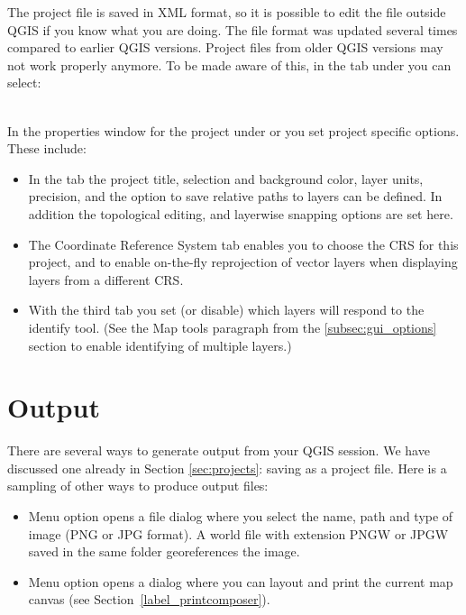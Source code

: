 The project file is saved in XML format, so it is possible to edit
the file outside QGIS if you know what you are doing. The file format
was updated several times compared to earlier QGIS versions. Project files
from older QGIS versions may not work properly anymore. To be made aware of this,
in the  tab under  \arrow {}
you can select: \\

 \\

In the properties window for the project under  or  you set project specific options. These
include:

\begin{itemize}
\item In the  tab the project title, selection and background
color, layer units, precision, and the option to save relative paths to
layers can be defined. In addition the topological editing, and layerwise
snapping options are set here.
\item The  Coordinate Reference System tab enables you to choose the
CRS for this project, and to enable on-the-fly reprojection of vector layers
when displaying layers from a different CRS.
\item With the third  tab you set (or disable) which
layers will respond to the identify tool. (See the Map tools paragraph from
the \ref{subsec:gui_options} section to enable identifying of multiple layers.)
\end{itemize}

\section{Output}\label{sec:output}

There are several ways to generate output from your QGIS session. We have
discussed one already in Section \ref{sec:projects}: saving as a project file.
Here is a sampling of other ways to produce output files:

\begin{itemize}
\item Menu option  opens
a file dialog where you select the name, path and type of image (PNG or JPG
format). A world file with extension PNGW or JPGW saved in the same folder
georeferences the image.
\item Menu option  opens a
dialog where you can layout and print the current map canvas (see
Section~\ref{label_printcomposer}).
\end{itemize}

